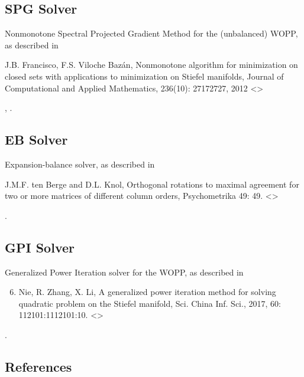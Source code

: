 \documentclass[a4paper,10pt,english]{sphinxmanual}
\begin{document}
\subsection{SPG Solver}
\label{\detokenize{solvers:spg-solver}}\label{\detokenize{solvers:spg}}
Nonmonotone Spectral Projected Gradient Method for the (unbalanced) WOPP, as described in %
\begin{footnote}[1]\sphinxAtStartFootnote
J.B. Francisco, F.S. Viloche Bazán, Nonmonotone algorithm for minimization on closed sets with applications to minimization on Stiefel manifolds, Journal of Computational and Applied Mathematics, 236(10): 2717\textendash{}2727, 2012 \textless{}\textgreater{}
%
\end{footnote}, \sphinxfootnotemark[2].


\subsection{EB Solver}
\label{\detokenize{solvers:eb}}\label{\detokenize{solvers:eb-solver}}
Expansion-balance solver, as described in %
\begin{footnote}[3]\sphinxAtStartFootnote
J.M.F. ten Berge and D.L. Knol, Orthogonal rotations to maximal agreement for two or more matrices of different column orders, Psychometrika 49: 49. \textless{}\textgreater{}
%
\end{footnote}.


\subsection{GPI Solver}
\label{\detokenize{solvers:gpi}}\label{\detokenize{solvers:gpi-solver}}
Generalized Power Iteration solver for the WOPP, as described in %
\begin{footnote}[5]\sphinxAtStartFootnote
\begin{enumerate}
\setcounter{enumi}{5}
\item {} 
Nie, R. Zhang, X. Li, A generalized power iteration method for solving quadratic problem on the Stiefel manifold, Sci. China Inf. Sci., 2017, 60: 112101:1\textendash{}112101:10. \textless{}\textgreater{}

\end{enumerate}
%
\end{footnote}.


\subsection{References}
\label{\detokenize{solvers:references}}
\end{document}
